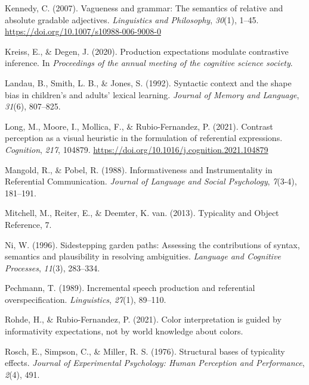 \documentclass[
  english,
  man,floatsintext]{apa6}
\newlength{\cslhangindent}
\newenvironment{cslreferences}%
  {\setlength{\parindent}{0pt}%
  \everypar{\setlength{\hangindent}{\cslhangindent}}\ignorespaces}%
  {\par}
\begin{document}
\begin{cslreferences}
\leavevmode\hypertarget{ref-kennedy_vagueness_2007}{}%
Kennedy, C. (2007). Vagueness and grammar: The semantics of relative and absolute gradable adjectives. \emph{Linguistics and Philosophy}, \emph{30}(1), 1--45. \url{https://doi.org/10.1007/s10988-006-9008-0}

\leavevmode\hypertarget{ref-kreiss2020production}{}%
Kreiss, E., \& Degen, J. (2020). Production expectations modulate contrastive inference. In \emph{Proceedings of the annual meeting of the cognitive science society}.

\leavevmode\hypertarget{ref-landau1992}{}%
Landau, B., Smith, L. B., \& Jones, S. (1992). Syntactic context and the shape bias in children's and adults' lexical learning. \emph{Journal of Memory and Language}, \emph{31}(6), 807--825.

\leavevmode\hypertarget{ref-long_contrast_2021}{}%
Long, M., Moore, I., Mollica, F., \& Rubio-Fernandez, P. (2021). Contrast perception as a visual heuristic in the formulation of referential expressions. \emph{Cognition}, \emph{217}, 104879. \url{https://doi.org/10.1016/j.cognition.2021.104879}

\leavevmode\hypertarget{ref-mangold_informativeness_1988}{}%
Mangold, R., \& Pobel, R. (1988). Informativeness and Instrumentality in Referential Communication. \emph{Journal of Language and Social Psychology}, \emph{7}(3-4), 181--191.

\leavevmode\hypertarget{ref-mitchell_2013}{}%
Mitchell, M., Reiter, E., \& Deemter, K. van. (2013). Typicality and Object Reference, 7.

\leavevmode\hypertarget{ref-nietal}{}%
Ni, W. (1996). Sidestepping garden paths: Assessing the contributions of syntax, semantics and plausibility in resolving ambiguities. \emph{Language and Cognitive Processes}, \emph{11}(3), 283--334.

\leavevmode\hypertarget{ref-pechmann_incremental_1989}{}%
Pechmann, T. (1989). Incremental speech production and referential overspecification. \emph{Linguistics}, \emph{27}(1), 89--110.

\leavevmode\hypertarget{ref-rohde2021color}{}%
Rohde, H., \& Rubio-Fernandez, P. (2021). Color interpretation is guided by informativity expectations, not by world knowledge about colors.

\leavevmode\hypertarget{ref-rosch_structural_1976}{}%
Rosch, E., Simpson, C., \& Miller, R. S. (1976). Structural bases of typicality effects. \emph{Journal of Experimental Psychology: Human Perception and Performance}, \emph{2}(4), 491.


\end{cslreferences}
\end{document}
